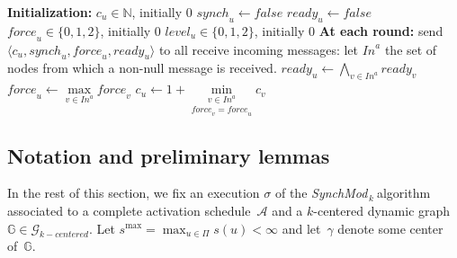 \documentclass[11pt,letterpaper]{article}
\newcommand{\cent}{\gamma}
\newcommand{\SM}{{\em SynchMod}$_{\,k}\ $}
\begin{document}
\begin{algorithm}[hbt!]
	\DontPrintSemicolon
	\textbf{Initialization:} \;
	\Indp
		$c_u \in \mathds{N}$, initially 0 \;
		$\mathit{synch}_u \leftarrow \mathit{false}$ \;
		$\mathit{ready}_u \leftarrow \mathit{false}$ \;
		$\mathit{force}_u \in \{0, 1, 2\}$, initially 0 \;
		$\mathit{level}_u \in \{0, 1, 2\}$, initially 0 \;
	\BlankLine
	\Indm
	\textbf{At each round:} \;
	\Indp
		send $\langle c_u, \mathit{synch}_u, \mathit{force}_u, \mathit{ready}_u \rangle$ to all  \;
		{\small receive incoming messages: let $\mathit{In}^a$ the set of nodes from which a non-null message is received.} \;
		$\mathit{ready}_u \leftarrow \underset{v \in \mathit{In}^a}{\bigwedge} \mathit{ready}_v $ \; \label{line:ready-gossip} 
		$\mathit{force}_u \leftarrow \underset{v \in \mathit{In}^a}{\max} \mathit{force}_v$ \;\label{line:force}
		$c_u \leftarrow 1+ \underset{\mathit{force}_v = \mathit{force}_u}{\underset{v \in \mathit{In}^a}{\min}} c_v$ \;\label{line:min-z-end} 
	\Indm
\caption{The \SM algorithm} 
\end{algorithm}

\subsection{Notation and preliminary lemmas}

In the rest of this section, we fix an execution $\sigma$ of the \SM algorithm associated to a complete activation
schedule~$\mathcal{A}$ and a $k$-centered dynamic graph~$\mathds{G} \in \mathcal{G}_{k-centered}$. 
Let $s^{\max} = \max_{u \in \Pi} s(u) < \infty$ and let~$\cent$ denote some center of~$\mathds{G}$.
\end{document}
